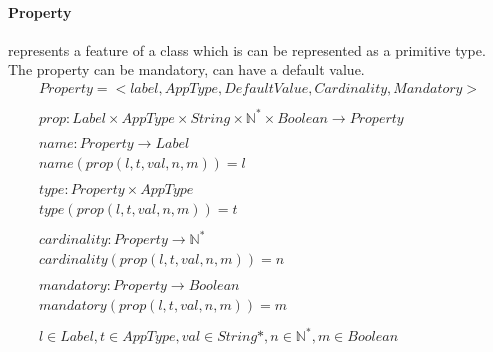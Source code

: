 \documentclass[11pt]{article}
\begin{document}
\paragraph{Property} represents a feature of  a class which is can be represented as a primitive type. The property can be mandatory, can have a default value.
\begin{gather*}
Property = <label, AppType, DefaultValue, Cardinality, Mandatory> \\ \\
prop : Label \times AppType \times String \times \mathbb{N^{*}} \times Boolean \rightarrow Property \\ \\
name : Property \rightarrow Label \\
name(prop(l, t, val, n, m)) = l \\ \\
type : Property \times AppType \\
type(prop(l, t, val, n, m)) = t \\ \\
cardinality : Property \rightarrow \mathbb{N^{*}} \\
cardinality(prop(l, t, val, n, m)) = n \\ \\
mandatory : Property \rightarrow Boolean \\
mandatory(prop(l, t, val, n, m)) = m  \\ \\
l \in Label, t \in AppType, val \in String*, n \in \mathbb{N^{*}}, m \in Boolean
\end{gather*}


\end{document}
